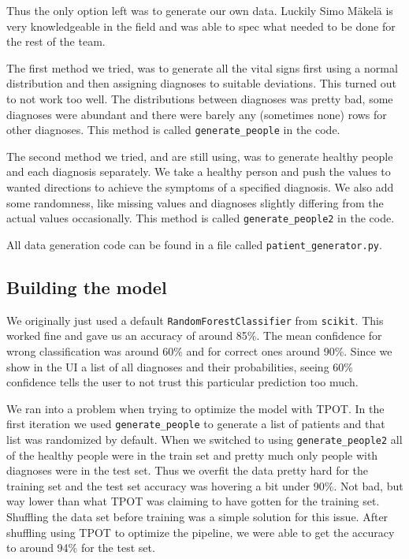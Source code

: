 \documentclass{article}
\begin{document}
Thus the only option left was to generate our own data. Luckily Simo M{\"a}kel{\"a} is very knowledgeable in the field and was able to spec what needed to be done for the rest of the team.

The first method we tried, was to generate all the vital signs first using a normal distribution and then assigning diagnoses to suitable deviations. This turned out to not work too well. The distributions between diagnoses was pretty bad, some diagnoses were abundant and there were barely any (sometimes none) rows for other diagnoses. This method is called \texttt{generate\_people} in the code.

The second method we tried, and are still using, was to generate healthy people and each diagnosis separately. We take a healthy person and push the values to wanted directions to achieve the symptoms of a specified diagnosis. We also add some randomness, like missing values and diagnoses slightly differing from the actual values occasionally. This method is called \texttt{generate\_people2} in the code.

All data generation code can be found in a file called \texttt{patient\_generator.py}.

\subsection{Building the model}
We originally just used a default \texttt{RandomForestClassifier} from \texttt{scikit}. This worked fine and gave us an accuracy of around 85\%. The mean confidence for wrong classification was around 60\% and for correct ones around 90\%. Since we show in the UI a list of all diagnoses and their probabilities, seeing 60\% confidence tells the user to not trust this particular prediction too much.

We ran into a problem when trying to optimize the model with TPOT. In the first iteration we used \texttt{generate\_people} to generate a list of patients and that list was randomized by default. When we switched to using \texttt{generate\_people2} all of the healthy people were in the train set and pretty much only people with diagnoses were in the test set. Thus we overfit the data pretty hard for the training set and the test set accuracy was hovering a bit under 90\%. Not bad, but way lower than what TPOT was claiming to have gotten for the training set. Shuffling the data set before training was a simple solution for this issue. After shuffling using TPOT to optimize the pipeline, we were able to get the accuracy to around 94\% for the test set.
\end{document}
